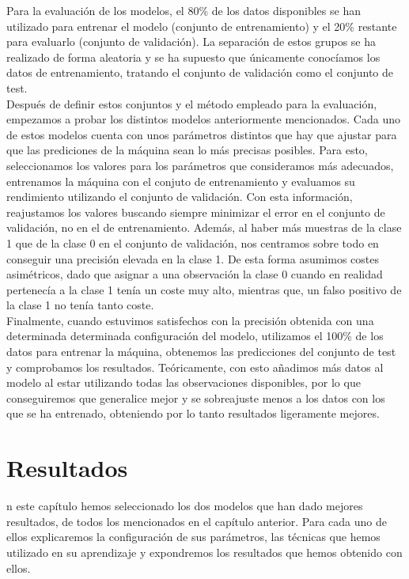 \documentclass[journal,twoside]{JoPhA}
\begin{document}
Para la evaluación de los modelos, el 80\% de los datos disponibles se han utilizado para entrenar el modelo (conjunto de entrenamiento) y el 20\% restante para evaluarlo (conjunto de validación). La separación de estos grupos se ha realizado de forma aleatoria y se ha supuesto que únicamente conocíamos los datos de entrenamiento, tratando el conjunto de validación como el conjunto de test. \\

Después de definir estos conjuntos y el método empleado para la evaluación, empezamos a probar los distintos modelos anteriormente mencionados. Cada uno de estos modelos cuenta con unos parámetros distintos que hay que ajustar para que las prediciones de la máquina sean lo más precisas posibles. Para esto, seleccionamos los valores para los parámetros que consideramos más adecuados, entrenamos la máquina con el conjuto de entrenamiento y evaluamos su rendimiento utilizando el conjunto de validación. Con esta información, reajustamos los valores buscando siempre minimizar el error en el conjunto de validación, no en el de entrenamiento. Además, al haber más muestras de la clase 1 que de la clase 0 en el conjunto de validación, nos centramos sobre todo en conseguir una precisión elevada en la clase 1. De esta forma asumimos costes asimétricos, dado que asignar a una observación la clase 0 cuando en realidad pertenecía a la clase 1 tenía un coste muy alto, mientras que, un falso positivo de la clase 1 no tenía tanto coste. \\

Finalmente, cuando estuvimos satisfechos con la precisión obtenida con una determinada determinada configuración del modelo, utilizamos el 100\% de los datos para entrenar la máquina, obtenemos las predicciones del conjunto de test y comprobamos los resultados. Teóricamente, con esto añadimos más datos al modelo al estar utilizando todas las observaciones disponibles, por lo que conseguiremos que generalice mejor y se sobreajuste menos a los datos con los que se ha entrenado, obteniendo por lo tanto resultados ligeramente mejores. \\


\section{Resultados}
n este capítulo hemos seleccionado los dos modelos que han dado mejores resultados, de todos los mencionados en el capítulo anterior. Para cada uno de ellos explicaremos la configuración de sus parámetros, las técnicas que hemos utilizado en su aprendizaje y expondremos los resultados que hemos obtenido con ellos.
\end{document}
